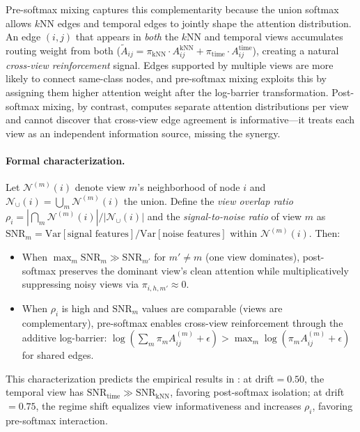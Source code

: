 \documentclass[11pt,a4paper]{article}
\newcommand{\calN}{\mathcal{N}}
\begin{document}
Pre-softmax mixing captures this complementarity because the union
softmax allows $k$NN edges and temporal edges to jointly shape the
attention distribution.
An edge $(i, j)$ that appears in \emph{both} the $k$NN and temporal
views accumulates routing weight from both
($\tilde{A}_{ij} = \pi_{\text{kNN}} \cdot A_{ij}^{\text{kNN}} +
\pi_{\text{time}} \cdot A_{ij}^{\text{time}}$), creating a natural
\emph{cross-view reinforcement} signal.
Edges supported by multiple views are more likely to connect
same-class nodes, and pre-softmax mixing exploits this by assigning
them higher attention weight after the log-barrier transformation.
Post-softmax mixing, by contrast, computes separate attention
distributions per view and cannot discover that cross-view edge
agreement is informative---it treats each view as an independent
information source, missing the synergy.

\paragraph{Formal characterization.}
Let $\calN^{(m)}(i)$ denote view $m$'s neighborhood of node $i$ and
$\calN_\cup(i) = \bigcup_m \calN^{(m)}(i)$ the union.
Define the \emph{view overlap ratio}
$\rho_i = |\bigcap_m \calN^{(m)}(i)| / |\calN_\cup(i)|$
and the \emph{signal-to-noise ratio} of view $m$ as
$\mathrm{SNR}_m = \mathrm{Var}[\text{signal features}] /
\mathrm{Var}[\text{noise features}]$ within $\calN^{(m)}(i)$.
Then:
\begin{itemize}[nosep]
  \item When $\max_m \mathrm{SNR}_m \gg \mathrm{SNR}_{m'}$ for
    $m' \neq m$ (one view dominates), post-softmax preserves the
    dominant view's clean attention while multiplicatively suppressing
    noisy views via $\pi_{i,h,m'} \approx 0$.
  \item When $\rho_i$ is high and $\mathrm{SNR}_m$ values are
    comparable (views are complementary), pre-softmax enables
    cross-view reinforcement through the additive log-barrier:
    $\log(\sum_m \pi_m A^{(m)}_{ij} + \epsilon) >
    \max_m \log(\pi_m A^{(m)}_{ij} + \epsilon)$ for shared edges.
\end{itemize}
This characterization predicts the empirical results in
: at drift${} = 0.50$, the temporal view has
$\mathrm{SNR}_{\text{time}} \gg \mathrm{SNR}_{\text{kNN}}$, favoring
post-softmax isolation; at drift${} = 0.75$, the regime shift
equalizes view informativeness and increases $\rho_i$, favoring
pre-softmax interaction.
\end{document}
